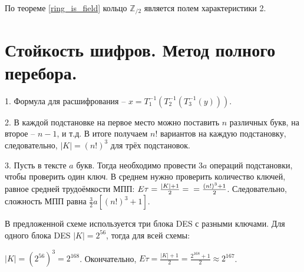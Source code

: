 \documentclass[letterpaper,11pt,openany]{book}
\begin{document}
По теореме \ref{ring_is_field} кольцо $\mathbb{Z}_{/2}$ является полем характеристики 2.


\section{Стойкость шифров. Метод полного перебора.}


1. Формула для расшифрования -- $x = T_1^{-1}(T_2^{-1}(T_3^{-1}(y))).$

2. В каждой подстановке на первое место можно поставить $n$ различных букв, на второе -- $n - 1$, и т.д. В итоге получаем $n!$ вариантов на каждую подстановку, следовательно, $|K| = (n!)^3$ для трёх подстановок.

3. Пусть в тексте $a$ букв. Тогда необходимо провести $3a$ операций подстановки, чтобы проверить один ключ. В среднем нужно проверить количество ключей, равное средней трудоёмкости МПП: $E\tau = \frac{|K| + 1}{2} = \\ = \frac{(n!)^3 + 1}{2}$. Следовательно, сложность МПП равна $\frac{3}{2}a[(n!)^3 + 1].$


В предложенной схеме используется три блока DES с разными ключами. Для одного блока DES $|K| = 2 ^ {56}$, тогда для всей схемы:

\noindent $|K| = (2 ^ {56}) ^ 3 = 2 ^ {168}$. Окончательно, $E\tau = \frac{|K| + 1}{2} = \frac{2 ^ {168} + 1}{2} \approx 2 ^ {167}$.

\end{document}
